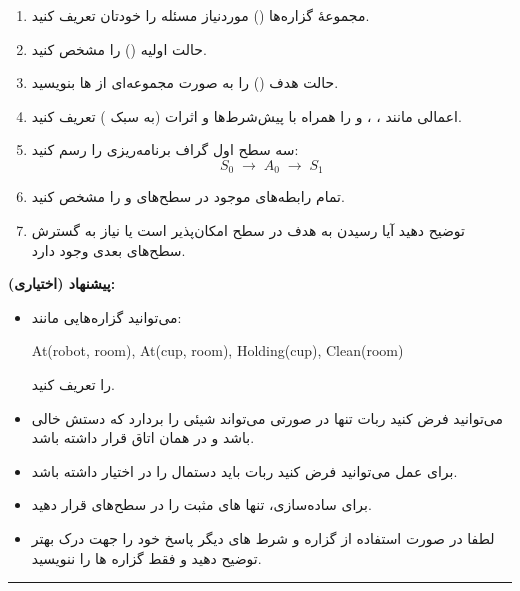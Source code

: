 \documentclass[a4paper,10pt]{article}
\begin{document}
\begin{enumerate}
    \item مجموعهٔ گزاره‌ها () موردنیاز مسئله را خودتان تعریف کنید.
    \item حالت اولیه () را مشخص کنید.
    \item حالت هدف () را به صورت مجموعه‌ای از ها بنویسید.
    \item اعمالی مانند ، ،  و  را همراه با
    پیش‌شرط‌ها و اثرات (به سبک ) تعریف کنید.
    \item سه سطح اول گراف برنامه‌ریزی را رسم کنید:
    \[
        S_0 \;\rightarrow\; A_0 \;\rightarrow\; S_1
    \]
    \item تمام رابطه‌های  موجود در سطح‌های  و  را مشخص کنید.
    \item توضیح دهید آیا رسیدن به هدف در سطح  امکان‌پذیر است یا نیاز به گسترش
    سطح‌های بعدی وجود دارد.
\end{enumerate}

\bigskip

\noindent
\textbf{پیشنهاد (اختیاری):}
\begin{itemize}
    \item می‌توانید گزاره‌هایی مانند:
    \begin{LTR}
    At(robot, room), At(cup, room), Holding(cup), Clean(room)
    \end{LTR}
    را تعریف کنید.
    
    \item می‌توانید فرض کنید ربات تنها در صورتی می‌تواند شیئی را بردارد که دستش خالی باشد
    و در همان اتاق قرار داشته باشد.
    
    \item برای عمل  می‌توانید فرض کنید ربات باید دستمال را در اختیار داشته باشد.
    
    \item برای ساده‌سازی، تنها های مثبت را در سطح‌های  قرار دهید.
    \item لطفا در صورت استفاده از گزاره و شرط های دیگر پاسخ خود را جهت درک بهتر توضیح دهید و فقط گزاره ها را ننویسید.
\end{itemize}

\bigskip
\bigskip
\rule{\linewidth}{0.4pt}
\end{document}
